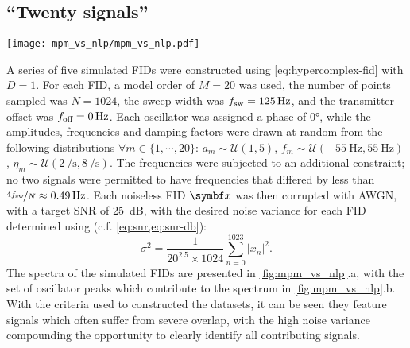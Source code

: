 \subsection{``Twenty signals''}
\begin{sidewaysfigure}
    \centering
    \texttt{[image: mpm\_vs\_nlp/mpm\_vs\_nlp.pdf]}
    \caption[
        The result of estimating a series of 5 simulated signals comprising 20
        signals, using solely the \acs{MPM} and also with phase
        variance-regularised \acs{NLP} afterwards.
    ]{
        The result of estimating a series of 5 simulated signals comprising 20
        signals. See the main text for details on how the datasets were constructed.
        \textbf{a.} Spectra of the datasets generated.
        \textbf{b.} Spectral lines corresponding to the set of signals
        used to generate each dataset.
        \textbf{c.} Plots of peaks for each oscillator generated using
        the \acs{MPM}.
        \textbf{d.} An equivalent plot for the result after applying phase
        variance-regularised \acs{NLP}, using the \acs{MPM} result as an
        initial guess.  Also included in c. and d. is the
        residual between the data and the sum of the oscillator peaks (grey
        line). The colouring of the oscillators in c. and d. is described
        in the main text.
    }
    \label{fig:mpm_vs_nlp}
\end{sidewaysfigure}
A series of five simulated \acp{FID} were constructed using
\cref{eq:hypercomplex-fid} with $D=1$. For each \ac{FID}, a model order
of $M=20$ was used, the number of points sampled was $N = 1024$, the sweep
width was $f_{\mathrm{sw}}=\qty{125}{\hertz}$, and the transmitter offset was $f_{\text{off}}
= \qty{0}{\hertz}$.  Each oscillator was assigned a phase of \ang{0}, while the
amplitudes, frequencies and damping factors were drawn at random from the
following distributions
$\forall m \in \lbrace 1, \cdots, 20\rbrace$:
$a_m \sim \mathcal{U}(1, 5)$, $f_m \sim \mathcal{U}(\qty{-55}{\hertz},
\qty{55}{\hertz})$, $\eta_m \sim \mathcal{U}(\qty{2}{\per\second},
\qty{8}{\per\second})$. The frequencies were subjected to an additional
constraint; no two signals were permitted to have frequencies that
differed by less than $\nicefrac{4 f_{\mathrm{sw}}}{N} \approx \qty{0.49}{\hertz}$.
Each noiseless \ac{FID} $\bx$ was then corrupted with \ac{AWGN}, with a target
\ac{SNR} of \qty{25}{\deci\bel}, with the desired noise variance for each
\ac{FID} determined using (c.f. \cref{eq:snr,eq:snr-db}):
\begin{equation}
    \sigma^2 = \frac{1}{20^{2.5} \times 1024}
        \sum_{n=0}^{1023} \lvert x_n \rvert^2.
\end{equation}
The spectra of the simulated \acp{FID} are presented in
\cref{fig:mpm_vs_nlp}.a, with the set of oscillator peaks which contribute
to the spectrum in \cref{fig:mpm_vs_nlp}.b. With the criteria used to
constructed the datasets, it can be seen they feature signals which often
suffer from severe overlap, with the high noise variance compounding the
opportunity to clearly identify all contributing signals.

